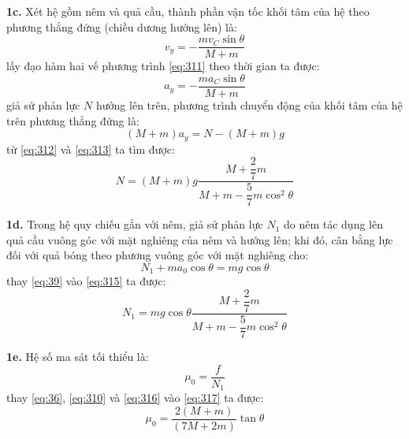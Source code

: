 \noindent\textbf{1c.} Xét hệ gồm nêm và quả cầu, thành phần vận tốc khối tâm của hệ theo phương thẳng đứng (chiều dương hướng lên) là:
\begin{equation}
  \label{eq:311}
  v_{y}=-\frac{mv_{C}\sin\theta}{M+m}
\end{equation}
lấy đạo hàm hai vế phương trình \eqref{eq:311} theo thời gian ta được:
\begin{equation}
  \label{eq:312}
  a_{y}=-\frac{ma_{C}\sin\theta}{M+m}
\end{equation}
giả sử phản lực $N$ hướng lên trên, phương trình chuyển động của khối tâm của hệ trên phương thẳng đứng là:
\begin{equation}
  \label{eq:313}
  (M+m)a_{y}=N-(M+m)g
\end{equation}
từ \eqref{eq:312} và \eqref{eq:313} ta tìm được:
\begin{equation}
  \label{eq:314}
  N=(M+m)g\frac{M+\dfrac{2}{7}m}{M+m-\dfrac{5}{7}m\cos^{2}\theta}
\end{equation}

\noindent\textbf{1d.} Trong hệ quy chiếu gắn với nêm, giả sử phản lực $N_{1}$ do nêm tác dụng lên quả cầu vuông góc với mặt nghiêng của nêm và hướng lên; khi đó, cân bằng lực đối với quả bóng theo phương vuông góc với mặt nghiêng cho:
\begin{equation}
  \label{eq:315}
  N_{1}+ma_{0}\cos\theta=mg\cos\theta
\end{equation}
thay \eqref{eq:39} vào \eqref{eq:315} ta được:
\begin{equation}
  \label{eq:316}
  N_{1}=mg\cos\theta\frac{M+\dfrac{2}{7}m}{M+m-\dfrac{5}{7}m\cos^{2}\theta}
\end{equation}

\noindent\textbf{1e.} Hệ số ma sát tối thiểu là:
\begin{equation}
  \label{eq:317}
  \mu_{0}=\frac{f}{N_{1}}
\end{equation}
thay \eqref{eq:36}, \eqref{eq:310} và \eqref{eq:316} vào \eqref{eq:317} ta được:
\begin{equation}
  \label{eq:318}
  \mu_{0}=\frac{2(M+m)}{(7M+2m)}\tan\theta
\end{equation}

